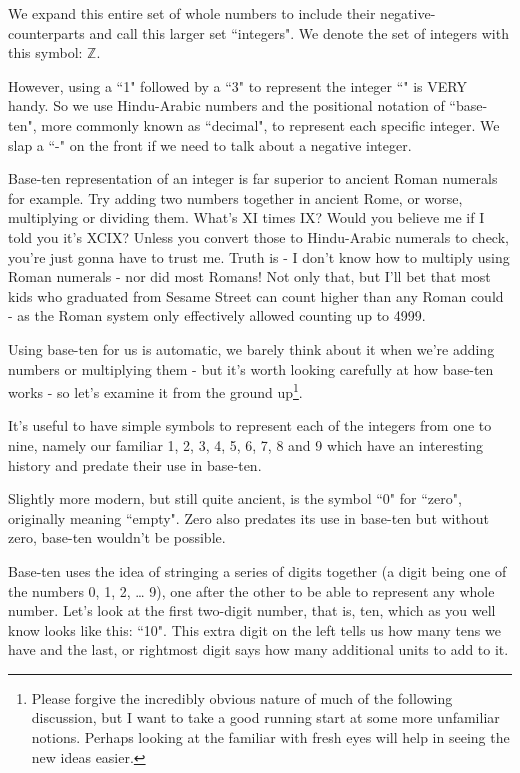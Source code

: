 \documentclass{article}
\begin{document}
We expand this entire set of whole numbers to include their
negative-counterparts and call this larger set ``integers".
We denote the set of integers with this symbol: $\mathbb{Z}$.

However, using a ``1" followed by a ``3" to represent the integer
``\faApple{}\faApple{}\faApple{}\faApple{}\faApple{}\faApple{}\faApple{}\faApple{}\faApple{}\faApple{}\faApple{}\faApple{}\faApple{}"
is VERY handy. So we use Hindu-Arabic numbers and the positional notation of ``base-ten",
more commonly known as ``decimal", to represent each specific integer.
We slap a ``-" on the front if we need to talk about a negative integer.

Base-ten representation of an integer is far superior to ancient Roman numerals for example.
Try adding two numbers together in ancient Rome, or worse,
multiplying or dividing them.
What's XI times IX? Would you believe me if I told
you it's XCIX? Unless you convert those to Hindu-Arabic numerals to check,
you're just gonna have to trust me.
Truth is - I don't know how to multiply using Roman
numerals - nor did most Romans! Not only that,
but I'll bet that most kids who graduated from Sesame Street
can count higher than any Roman could - as the
Roman system only effectively allowed counting up to 4999.

Using base-ten for us is automatic,
we barely think about it when we're adding numbers or multiplying
them - but it's worth looking carefully at how base-ten
works - so let's examine it from the ground up\footnote{Please forgive the incredibly obvious nature of much
of the following discussion, but I want to take a good running start
at some more unfamiliar notions. Perhaps looking at the familiar with fresh eyes will help in seeing the new ideas easier.}.

It's useful to have simple symbols to represent each of the integers from one to nine,
namely our familiar 1, 2, 3, 4, 5, 6, 7, 8 and 9
which have an interesting history and predate their use in base-ten.

Slightly more modern, but still quite ancient,
is the symbol ``0" for ``zero", originally meaning ``empty".
Zero also predates its use in base-ten but without zero,
base-ten wouldn't be possible.

Base-ten uses the idea of stringing a series of digits together
(a digit being one of the numbers 0, 1, 2, \dots{} 9),
one after the other to be able to represent any whole number.
Let's look at the first two-digit number, that is, ten,
which as you well know looks like this: ``10".
This extra digit on the left tells us how many tens we have and the last,
or rightmost digit says how many additional units to add to it.
\end{document}
